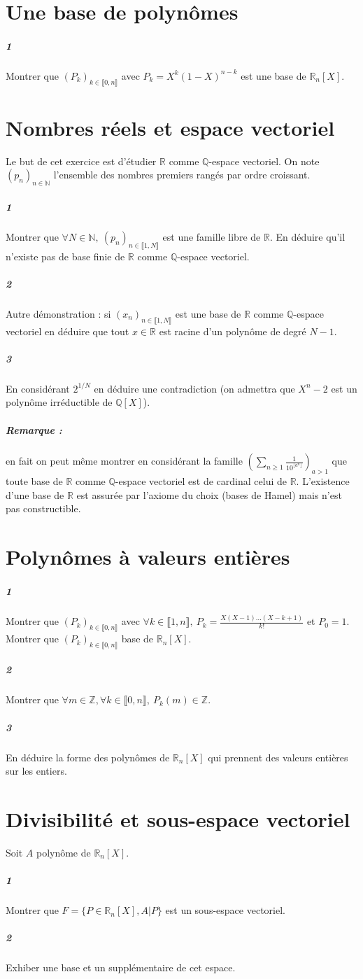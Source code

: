\documentclass[10pt,a4paper]{article}
\begin{document}
\section{Une base de polynômes}
\subparagraph{1}Montrer que $(P_k)_{k \in \llbracket 0,n \rrbracket}$ avec $P_k=X^k(1-X)^{n-k}$ est une base de $\mathbb{R}_n[X]$. 

\section{Nombres réels et espace vectoriel}
Le but de cet exercice est d'étudier $\mathbb{R}$ comme $\mathbb{Q}$-espace vectoriel. On note $(p_n)_{n \in \mathbb{N}}$ l'ensemble des nombres premiers rangés par ordre croissant.
\subparagraph{1} Montrer que $\forall N \in \mathbb{N}, \ (p_n)_{n \in \llbracket 1,N \rrbracket}$ est une famille libre de $\mathbb{R}$. En déduire qu'il n'existe pas de base finie de $\mathbb{R}$ comme $\mathbb{Q}$-espace vectoriel.
\subparagraph{2} Autre démonstration : si $(x_n)_{n \in \llbracket 1,N \rrbracket}$ est une base de $\mathbb{R}$ comme $\mathbb{Q}$-espace vectoriel en déduire que tout $x\in \mathbb{R}$ est racine d'un polynôme de degré $N-1$.
\subparagraph{3}En considérant $2^{1/N}$ en déduire une contradiction (on admettra que $X^n-2$ est un polynôme irréductible de $\mathbb{Q}[X]$).

\subparagraph{Remarque :} en fait on peut même montrer en considérant la famille $(\underset{n \ge 1}{\sum} \frac{1}{10^{\lfloor a^n \rfloor}})_{a>1}$ que toute base de $\mathbb{R}$ comme $\mathbb{Q}$-espace vectoriel est de cardinal celui de $\mathbb{R}$. L'existence d'une base de $\mathbb{R}$ est assurée par l'axiome du choix (bases de Hamel) mais n'est pas constructible.

\section{Polynômes à valeurs entières}
\subparagraph{1}Montrer que $(P_k)_{k \in \llbracket 0,n\rrbracket}$ avec $\forall k \in \llbracket 1,n \rrbracket, \ P_k = \frac{X (X-1) \dots (X-k+1)}{k !}$ et $P_0=1$. Montrer que $(P_k)_{k \in \llbracket 0,n\rrbracket}$ base de $\mathbb{R}_n[X]$.
\subparagraph{2}Montrer que $\forall m \in \mathbb{Z}, \forall k \in \llbracket 0,n\rrbracket, \ P_k(m) \in \mathbb{Z}$.
\subparagraph{3}En déduire la forme des polynômes de $\mathbb{R}_n[X]$ qui prennent des valeurs entières sur les entiers.

\section{Divisibilité et sous-espace vectoriel}
Soit $A$ polynôme de $\mathbb{R}_n[X]$.
\subparagraph{1}Montrer que $F=\lbrace P \in \mathbb{R}_n[X], A \vert P \rbrace$ est un sous-espace vectoriel.
\subparagraph{2}Exhiber une base et un supplémentaire de cet espace.
\end{document}
